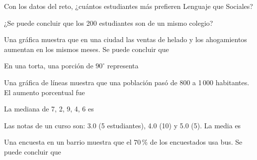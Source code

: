 \taller
{}
\begin{ejercicios}
\item Con los datos del reto, ¿cuántos estudiantes más prefieren Lenguaje que Sociales? 
\item ¿Se puede concluir que los 200 estudiantes son de un mismo colegio? 
\end{ejercicios}
\begin{ejercicios}
\item Una gráfica muestra que en una ciudad las ventas de helado y los ahogamientos aumentan en los mismos meses. Se puede concluir que
\end{ejercicios}

\bitacora

\evaluacion
\begin{ejercicios}
\item En una torta, una porción de $90^\circ$ representa
\item Una gráfica de líneas muestra que una población pasó de 800 a 1\,000 habitantes. El aumento porcentual fue
\item La mediana de 7, 2, 9, 4, 6 es
\item Las notas de un curso son: 3.0 (5 estudiantes), 4.0 (10) y 5.0 (5). La media es
\item Una encuesta en un barrio muestra que el $70\,\%$ de los encuestados usa bus. Se puede concluir que
\end{ejercicios}
